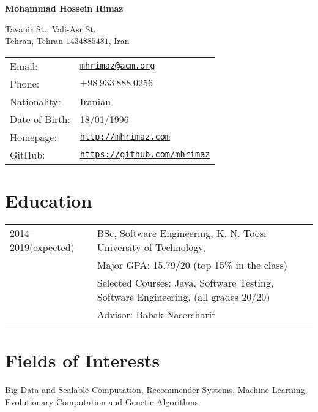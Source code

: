 \documentclass[letterpaper]{article}
\def\name{Mohammad Hossein Rimaz}
\renewenvironment{itemize}{
  \begin{list}{}{
    \setlength{\leftmargin}{1.5em}
  }
}{
  \end{list}
}
\begin{document}
{\huge \bf \name}


\vspace{0.25in}

\begin{minipage}{0.45\linewidth}
  Tavanir St., Vali-Asr St. \\
  Tehran, Tehran $1434885481$, Iran
\end{minipage}
\begin{minipage}{0.45\linewidth}
  \begin{tabular}{ll}
    Email: & \href{mailto:mhrimaz@acm.org}{\tt mhrimaz@acm.org} \\
    Phone: & $+98~933~888~0256$ \\
    Nationality: & Iranian \\
    Date of Birth: & 18/01/1996  \\
    Homepage: & \href{http://mhrimaz.com}{\tt http://mhrimaz.com} \\
    GitHub: & \href{https://mhrimaz.github.io}{\tt https://github.com/mhrimaz} 
  \end{tabular}
\end{minipage}


\section*{Education}

{\renewcommand{\arraystretch}{1.2}
\begin{tabular}{l l}
2014--2019(expected) & BSc, Software Engineering, K. N. Toosi University of Technology,\\
 & Major GPA: 15.79/20 (top 15\% in the class) \\
 & Selected Courses: Java, Software Testing, Software Engineering. (all grades 20/20)\\
 & Advisor: Babak Nasersharif
\end{tabular}
}

\section*{Fields of Interests}

\begin{itemize}
	\item Big Data and Scalable Computation, Recommender Systems, Machine Learning, Evolutionary Computation and Genetic Algorithms 
\end{itemize}
\end{document}
